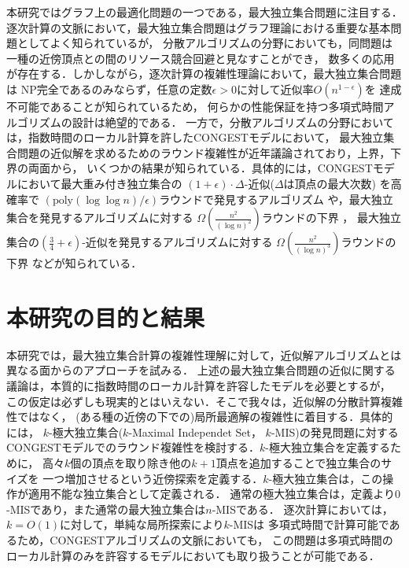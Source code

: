 \documentclass[12pt]{thesis}
\newcommand{\CONGEST}{\textsf{CONGEST}}
\theoremstyle{definition}
\begin{document}
本研究ではグラフ上の最適化問題の一つである，最大独立集合問題に注目する．
逐次計算の文脈において，最大独立集合問題はグラフ理論における重要な基本問題としてよく知られているが，
分散アルゴリズムの分野においても，同問題は一種の近傍頂点との間のリソース競合回避と見なすことができ，
数多くの応用が存在する．しかしながら，逐次計算の複雑性理論において，最大独立集合問題は
NP完全であるのみならず，任意の定数$\epsilon > 0$に対して近似率$O(n^{1-\epsilon})$を
達成不可能であることが知られている\cite{haastad1999clique}ため，
何らかの性能保証を持つ多項式時間アルゴリズムの設計は絶望的である．
一方で，分散アルゴリズムの分野においては，指数時間のローカル計算を許した{\CONGEST}モデルにおいて，
最大独立集合問題の近似解を求めるためのラウンド複雑性が近年議論されており，上界，下界の両面から，
いくつかの結果が知られている．具体的には，{\CONGEST}モデルにおいて最大重み付き独立集合の
$(1 + \epsilon) \cdot \Delta$-近似($\Delta$は頂点の最大次数) を高確率で
$\left(\mathrm{poly}(\log \log n)/\epsilon \right)$ラウンドで発見するアルゴリズム
\cite{kawarabayashi2019improved} や，最大独立集合を発見するアルゴリズムに対する
$\Omega \left(\frac{n^{2}}{(\log n)^{2}}\right)$ラウンドの下界 \cite{censor2017quadratic}，
最大独立集合の$(\frac{3}{4} + \epsilon)$-近似を発見するアルゴリズムに対する
$\Omega \left(\frac{n^{2}}{(\log n)^{3}}\right)$ラウンドの下界 \cite{efron2020beyond} などが知られている．

\section{本研究の目的と結果}
本研究では，最大独立集合計算の複雑性理解に対して，近似解アルゴリズムとは異なる面からのアプローチを試みる．
上述の最大独立集合問題の近似に関する議論は，本質的に指数時間のローカル計算を許容したモデルを必要とするが，
この仮定は必ずしも現実的とはいえない．そこで我々は，近似解の分散計算複雑性ではなく，
(ある種の近傍の下での)局所最適解の複雑性に着目する．具体的には，
$k$-極大独立集合($k$-Maximal Independet Set， $k$-MIS)の発見問題に対する
{\CONGEST}モデルでのラウンド複雑性を検討する．$k$-極大独立集合を定義するために，
高々$k$個の頂点を取り除き他の$k+1$頂点を追加することで独立集合のサイズを
一つ増加させるという近傍探索を定義する．$k$-極大独立集合は，この操作が適用不能な独立集合として定義される．
通常の極大独立集合は，定義より$0$-MISであり，また通常の最大独立集合は$n$-MISである．
逐次計算においては，$k=O(1)$に対して，単純な局所探索により$k$-MISは
多項式時間で計算可能であるため，{\CONGEST}アルゴリズムの文脈においても，
この問題は多項式時間のローカル計算のみを許容するモデルにおいても取り扱うことが可能である．
\end{document}

